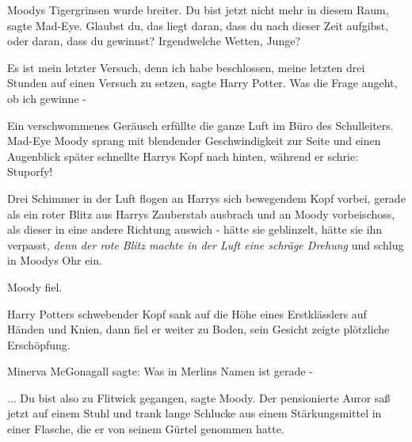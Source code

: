 Moodys Tigergrinsen wurde breiter. \glqq{}Du bist jetzt nicht mehr in diesem
Raum\grqq{}, sagte Mad-Eye. \glqq{}Glaubst du, das liegt daran, dass du nach
dieser Zeit aufgibst, oder daran, dass du gewinnst? Irgendwelche Wetten,
Junge?\grqq{}

\glqq{}Es ist mein letzter Versuch, denn ich habe beschlossen, meine letzten drei
Stunden auf einen Versuch zu setzen\grqq{}, sagte Harry Potter. \glqq{}Was die
Frage angeht, ob ich gewinne -\grqq{}

Ein verschwommenes Geräusch erfüllte die ganze Luft im Büro des Schulleiters.
Mad-Eye Moody sprang mit blendender Geschwindigkeit zur Seite und einen
Augenblick später schnellte Harrys Kopf nach hinten, während er schrie: \glqq{}
Stuporfy!\grqq{}

Drei Schimmer in der Luft flogen an Harrys sich bewegendem Kopf vorbei, gerade
als ein roter Blitz aus Harrys Zauberstab ausbrach und an Moody vorbeischoss,
als dieser in eine andere Richtung auswich - hätte sie geblinzelt, hätte sie ihn
verpasst, \emph{denn der rote Blitz machte in der Luft eine schräge Drehung} und
schlug in Moodys Ohr ein.

Moody fiel.

Harry Potters schwebender Kopf sank auf die Höhe eines Erstklässlers auf Händen
und Knien, dann fiel er weiter zu Boden, sein Gesicht zeigte plötzliche
Erschöpfung.

Minerva McGonagall sagte: \glqq{}Was in Merlins Namen ist gerade -\grqq{}

... \glqq{}Du bist also zu Flitwick gegangen\grqq{}, sagte Moody. Der
pensionierte Auror saß jetzt auf einem Stuhl und trank lange Schlucke aus einem
Stärkungsmittel in einer Flasche, die er von seinem Gürtel genommen hatte.

